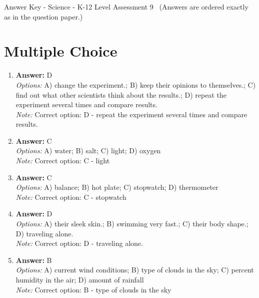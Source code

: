 \documentclass[12pt]{article}
\begin{document}
\begin{center}
Answer Key - Science - K-12 Level Assessment 9 \
\small (Answers are ordered exactly as in the question paper.)
\end{center}

\section*{Multiple Choice}
\begin{enumerate}[label=\arabic*.]
\item \textbf{Answer:} D
\\ \textit{Options:} A) change the experiment.; B) keep their opinions to themselves.; C) find out what other scientists think about the results.; D) repeat the experiment several times and compare results.
\\ \textit{Note:} Correct option: D - repeat the experiment several times and compare results.
\item \textbf{Answer:} C
\\ \textit{Options:} A) water; B) salt; C) light; D) oxygen
\\ \textit{Note:} Correct option: C - light
\item \textbf{Answer:} C
\\ \textit{Options:} A) balance; B) hot plate; C) stopwatch; D) thermometer
\\ \textit{Note:} Correct option: C - stopwatch
\item \textbf{Answer:} D
\\ \textit{Options:} A) their sleek skin.; B) swimming very fast.; C) their body shape.; D) traveling alone.
\\ \textit{Note:} Correct option: D - traveling alone.
\item \textbf{Answer:} B
\\ \textit{Options:} A) current wind conditions; B) type of clouds in the sky; C) percent humidity in the air; D) amount of rainfall
\\ \textit{Note:} Correct option: B - type of clouds in the sky
\end{enumerate}
\end{document}
